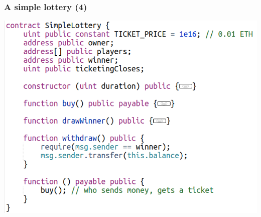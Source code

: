 \documentclass[11pt]{beamer}  %
\begin{document}
\begin{frame}\frametitle{A simple lottery (4)}

  \begin{center}
    \includegraphics[scale=0.45,clip=false]{pictures/simple-lottery-4.png}
  \end{center}

\end{frame}
\end{document}
